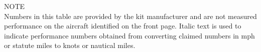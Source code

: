 \begin{center}
NOTE\\
Numbers in this table are provided by the kit manufacturer and are not measured performance on the aircraft identified on the front page.  
Italic text is used to indicate performance numbers obtained from  converting claimed numbers in mph or statute miles to  knots or nautical miles.
\end{center}